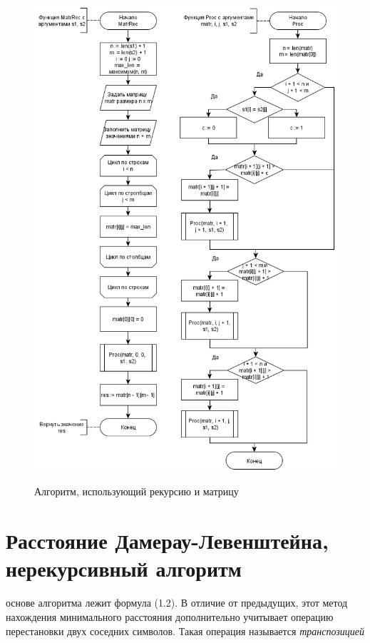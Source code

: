 \documentclass[12pt]{report}
\begin{document}
\begin{figure}[h]
	\begin{center}
		{\includegraphics[scale = 0.61]{MatrRec_part2}}
		\caption{Алгоритм, использующий рекурсию и матрицу}
	\end{center}
\end{figure}

\section{Расстояние Дамерау-Левенштейна, нерекурсивный алгоритм}
 основе алгоритма лежит формула (1.2). В отличие от предыдущих, этот метод нахождения минимального расстояния дополнительно учитывает операцию перестановки двух соседних символов. Такая операция называется \textit{транспозицией}\\
\end{document}
